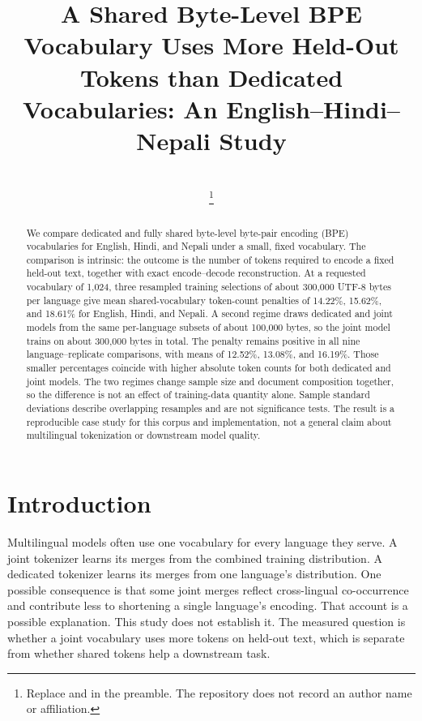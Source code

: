 \documentclass[10pt,twocolumn]{article}
\title{A Shared Byte-Level BPE Vocabulary Uses More Held-Out Tokens than Dedicated Vocabularies: An English--Hindi--Nepali Study}
\author{\paperauthor\\
{\paperaffil}\thanks{Replace \texttt{\string\paperauthor} and \texttt{\string\paperaffil} in the preamble. The repository does not record an author name or affiliation.}}
\date{}
\begin{document}
\maketitle

\begin{abstract}
We compare dedicated and fully shared byte-level byte-pair encoding (BPE) vocabularies for English, Hindi, and Nepali under a small, fixed vocabulary.
The comparison is intrinsic: the outcome is the number of tokens required to encode a fixed held-out text, together with exact encode--decode reconstruction.
At a requested vocabulary of 1{,}024, three resampled training selections of about 300{,}000 UTF-8 bytes per language give mean shared-vocabulary token-count penalties of 14.22\%, 15.62\%, and 18.61\% for English, Hindi, and Nepali.
A second regime draws dedicated and joint models from the same per-language subsets of about 100{,}000 bytes, so the joint model trains on about 300{,}000 bytes in total.
The penalty remains positive in all nine language--replicate comparisons, with means of 12.52\%, 13.08\%, and 16.19\%.
Those smaller percentages coincide with higher absolute token counts for both dedicated and joint models.
The two regimes change sample size and document composition together, so the difference is not an effect of training-data quantity alone.
Sample standard deviations describe overlapping resamples and are not significance tests.
The result is a reproducible case study for this corpus and implementation, not a general claim about multilingual tokenization or downstream model quality.
\end{abstract}

\section{Introduction}

Multilingual models often use one vocabulary for every language they serve.
A joint tokenizer learns its merges from the combined training distribution.
A dedicated tokenizer learns its merges from one language's distribution.
One possible consequence is that some joint merges reflect cross-lingual co-occurrence and contribute less to shortening a single language's encoding.
That account is a possible explanation.
This study does not establish it.
The measured question is whether a joint vocabulary uses more tokens on held-out text, which is separate from whether shared tokens help a downstream task.
\end{document}
